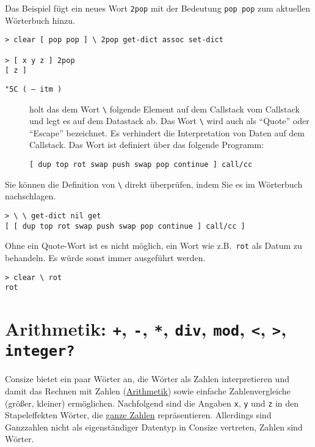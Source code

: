Das Beispiel fügt ein neues Wort \verb|2pop| mit der Bedeutung \verb|pop pop| zum aktuellen Wörterbuch hinzu.

\begin{verbatim}
> clear [ pop pop ] \ 2pop get-dict assoc set-dict

> [ x y z ] 2pop
[ z ]
\end{verbatim}

\begin{description}
\item[\texttt{{\char "5C}\ ( -- itm )}] holt das dem Wort \verb|\| folgende Element auf dem Callstack vom Callstack und legt es auf dem Datastack ab. Das Wort \verb|\| wird auch als "`Quote"' oder "`Escape"' bezeichnet. Es verhindert die Interpretation von Daten auf dem Callstack. Das Wort ist definiert über das folgende Programm:
\begin{verbatim}
[ dup top rot swap push swap pop continue ] call/cc
\end{verbatim}
\end{description}

Sie können die Definition von \verb|\| direkt überprüfen, indem Sie es im Wörterbuch nachschlagen.

\begin{verbatim}
> \ \ get-dict nil get
[ [ dup top rot swap push swap pop continue ] call/cc ]
\end{verbatim}

Ohne ein Quote-Wort ist es nicht möglich, ein Wort wie z.B.\ \verb|rot| als Datum zu behandeln. Es würde sonst immer ausgeführt werden.

\begin{verbatim}
> clear \ rot
rot
\end{verbatim}

\section{Arithmetik: \texttt{+}, \texttt{-}, \texttt{*}, \texttt{div}, \texttt{mod}, \texttt{<}, \texttt{>}, \texttt{integer?}}

Consize bietet ein paar Wörter an, die Wörter als Zahlen interpretieren und damit das Rechnen mit Zahlen (\href{http://de.wikipedia.org/wiki/Arithmetik}{Arithmetik}) sowie einfache Zahlenvergleiche (größer, kleiner) ermöglichen. Nachfolgend sind die Angaben \verb|x|, \verb|y| und \verb|z| in den Stapeleffekten Wörter, die \href{http://de.wikipedia.org/wiki/Ganze\_Zahlen}{ganze Zahlen} repräsentieren. Allerdings sind Ganzzahlen nicht als eigenständiger Datentyp in Consize vertreten, Zahlen sind Wörter.

